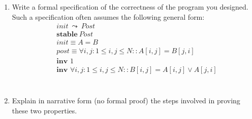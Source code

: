 \documentclass{article}
\begin{document}
\begin{enumerate}
\item
Write a formal specification of the correctness of the program you designed. Such a specification often assumes the following general form:\\
\begin{align*}
&init \ \leadsto \ Post\\
&\textbf{stable} \ Post\\
&init \equiv A=B\\
&post \equiv \forall i,j : 1\leq i,j \leq N :: A[i,j]=B[j,i]\\
&\textbf{inv\ } 1\\
&\textbf{inv\ } \forall i,j : 1\leq i,j \leq N :: B[i,j]=A[i,j] \vee A[j,i] \\%
\end{align*}
\\
\item
Explain in narrative form (no formal proof) the steps involved in proving these two properties.\\
\end{enumerate}
\end{document}
